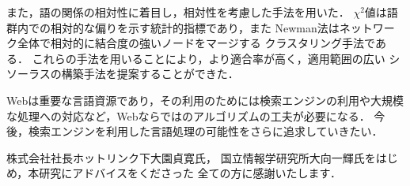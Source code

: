 \documentclass[japanese]{jnlp_1.3a}
\begin{document}
また，語の関係の相対性に着目し，相対性を考慮した手法を用いた．
$\chi^2値$は語群内での相対的な偏りを示す統計的指標であり，また
Newman法はネットワーク全体で相対的に結合度の強いノードをマージする
クラスタリング手法である．
これらの手法を用いることにより，より適合率が高く，適用範囲の広い
シソーラスの構築手法を提案することができた．

Webは重要な言語資源であり，その利用のためには検索エンジンの利用や大規模な処理への対応など，Webならではのアルゴリズムの工夫が必要になる．
今後，検索エンジンを利用した言語処理の可能性をさらに追求していきたい．

\acknowledgment

株式会社社長ホットリンク下大園貞寛氏，
国立情報学研究所大向一輝氏をはじめ，本研究にアドバイスをくださった
全ての方に感謝いたします．



\end{document}
